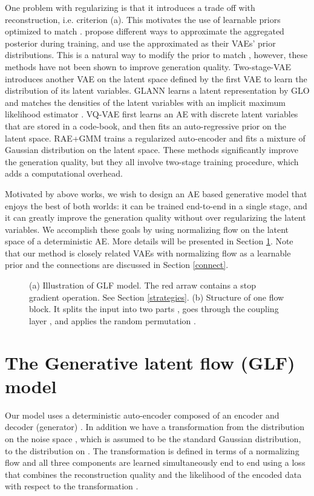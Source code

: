 \documentclass{article}
\begin{document}
One problem with regularizing  is that it introduces a trade off with reconstruction, i.e. criterion (a). This motivates the use of learnable priors optimized to match . \citep{vamp, hiera,resample} propose different ways to approximate the aggregated posterior  during training, and use the approximated  as their VAEs' prior distributions. This is a natural way to modify the prior to match , however, these methods have not been shown to improve generation quality. Two-stage-VAE\citep{TwoVAE} introduces another VAE on the latent space defined by the first VAE to learn the distribution of its latent variables. GLANN \citep{NAIS} learns a latent representation by GLO \citep{GLO} and matches the densities of the latent variables with an implicit maximum likelihood estimator \citep{IMLE}. VQ-VAE \citep{VQVAE} first learns an AE with discrete latent variables that are stored in a code-book, and then fits an auto-regressive prior on the latent space. RAE+GMM\citep{From} trains a regularized auto-encoder \citep{RAE} and fits a mixture of Gaussian distribution on the latent space. These methods significantly improve the generation quality, but they all involve two-stage training procedure, which adds a computational overhead.

Motivated by above works, we wish to design an AE based generative model that enjoys the best of both worlds: it can be trained end-to-end in a single stage, and it can greatly improve the generation quality without over regularizing the latent variables. We accomplish these goals by using normalizing flow on the latent space of a deterministic AE. More details will be presented in Section \ref{model}. Note that our method is closely related VAEs with normalizing flow as a learnable prior and the connections are discussed in Section \ref{connect}.

\begin{figure}[ht]
\centering
{}\hspace{4pt}
\caption{(a) Illustration of GLF model. The red arraw contains a stop gradient operation. See Section \ref{strategies}. (b) Structure of one flow block. It splits the input into two parts , goes through the coupling layer , and applies the random permutation .} \label{fig:1}
\end{figure}

\section{The Generative latent flow (GLF) model} \label{model}
Our model uses a deterministic auto-encoder composed of an encoder  and decoder (generator) . In addition we have a transformation   from the distribution on the noise space , which is assumed to be the standard Gaussian distribution, to the distribution on . The transformation  is defined in terms of a normalizing flow and all three components are learned simultaneously end to end using a loss that combines the reconstruction quality and the likelihood of the encoded data  with respect to the transformation .
 
\end{document}
